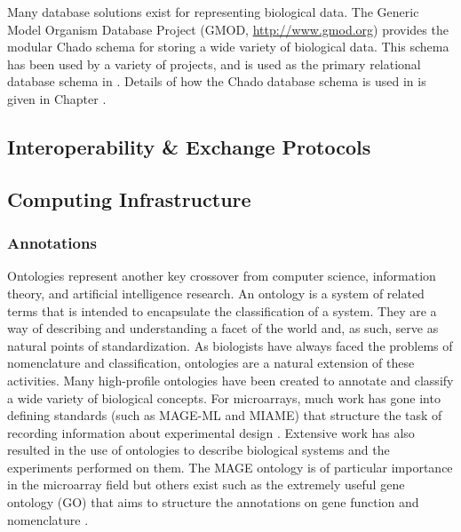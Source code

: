 Many database solutions exist for representing biological data.  The Generic
Model Organism Database Project (GMOD, \url{http://www.gmod.org}) provides the
modular Chado schema \cite{chado} for storing a wide variety of biological
data.  This schema has been used by a variety of projects, and is used as the
primary relational database schema in \dbthesis.  Details of how the Chado
database schema is used in \dbthesis is given in Chapter \dbthesis.

\subsection{Interoperability \& Exchange Protocols}
\label{Protocol}

\subsection{Computing Infrastructure}
\label{Infrastructure}









\subsubsection{Annotations}

Ontologies represent another key crossover from computer science, information
theory, and artificial intelligence research.  An ontology is a system of
related terms that is intended to encapsulate the classification of a system.
They are a way of describing and understanding a facet of the world and, as such,
serve as natural points of standardization.  As biologists have always faced
the problems of nomenclature and classification, ontologies are a natural
extension of these activities.  Many high-profile ontologies have been created
to annotate and classify a wide variety of biological concepts.  For
microarrays, much work has gone into defining standards (such as MAGE-ML and
MIAME) that structure the task of recording information about experimental
design \cite{brazma2001mim}. Extensive work has also resulted in the use of
ontologies to describe biological systems and the experiments performed on
them.  The MAGE ontology is of particular importance in the microarray field
but others exist such as the extremely useful gene ontology (GO) that aims to
structure the annotations on gene function and nomenclature
\cite{stoeckert2003mof,ashburner2000got}.

